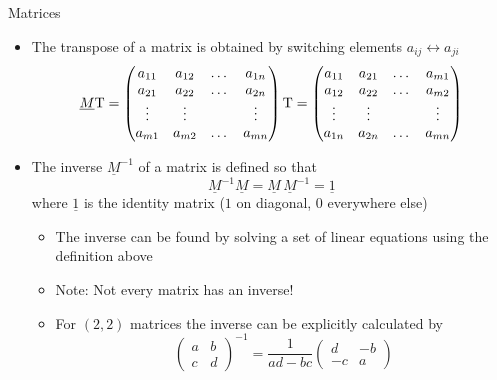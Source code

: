   \begin{frame}{Matrices}
    \begin{itemize}
      \item The transpose of a matrix is obtained by switching
        elements $a_{ij}\leftrightarrow a_{ji}$
        \begin{equation*}
          \underline{M}\text{T} =
          \begin{pmatrix}
            a_{11} & a_{12} & \dots & a_{1n} \\
            a_{21} & a_{22} & \dots & a_{2n} \\
            \vdots & \vdots &  & \vdots \\
            a_{m1} & a_{m2} & \dots & a_{mn} \\
          \end{pmatrix}\text{T} =
          \begin{pmatrix}
            a_{11} & a_{21} & \dots & a_{m1} \\
            a_{12} & a_{22} & \dots & a_{m2} \\
            \vdots & \vdots &  & \vdots \\
            a_{1n} & a_{2n} & \dots & a_{mn} \\
          \end{pmatrix}
        \end{equation*}
      \item The inverse $\underline{M}^{-1}$ of a matrix is defined so that
        \begin{equation*}
          \underline{M}^{-1}\underline{M} =
          \underline{M}\,\underline{M}^{-1} = \underline{1}
        \end{equation*}
        where $\underline{1}$ is the identity matrix
        ($1$ on diagonal, $0$ everywhere else)
        \begin{itemize}
          \item The inverse can be found by solving a set of linear equations
            using the definition above
          \item Note: Not every matrix has an inverse!
          \item For $(2,2)$ matrices the inverse can be explicitly calculated by
            \begin{equation*}
              \begin{pmatrix} a & b \\ c & d \end{pmatrix}^{-1} =
              \frac{1}{ad-bc}
                \begin{pmatrix} d & -b \\ -c & a \end{pmatrix}
            \end{equation*}
        \end{itemize}
    \end{itemize}
  \end{frame}

